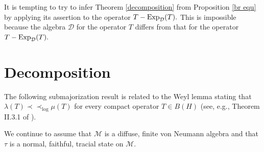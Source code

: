\documentclass{amsart}
\theoremstyle{plain}
\theoremstyle{remark}
\begin{document}
It is tempting to try to infer Theorem \ref{decomposition} from Proposition \ref{br equ} by applying its assertion to the operator $T-{\rm Exp}_{\mathcal{D}}(T).$ This is impossible because the algebra $\mathcal{D}$ for the operator $T$ differs from that for the operator $T-{\rm Exp}_{\mathcal{D}}(T).$

\section{Decomposition}

The following submajorization result is related to the Weyl lemma stating that $\lambda(T)\prec\prec_{\log}\mu(T)$ for every compact operator $T\in B(H)$ (see, e.g., Theorem II.3.1 of \cite{GK1}).

We continue to assume that $\mathcal{M}$ is a diffuse, finite von Neumann algebra and that $\tau$ is a normal, faithful, tracial state
on $\mathcal{M}$.
\end{document}
